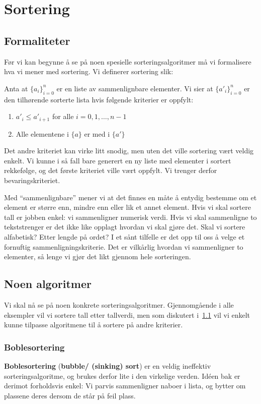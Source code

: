 \section{\color{red}Sortering}
\subsection{Formaliteter}
\label{sort_form}
Før vi kan begynne å se på noen spesielle sorteringsalgoritmer må vi formalisere hva vi mener med sortering. Vi definerer sortering slik:

\begin{definisjon}
Anta at $ {\{a_i\}}_{i=0}^n $ er en liste av sammenlignbare elementer. Vi sier at $ {\{a'_i\}}_{i=0}^n $ er den tilhørende sorterte lista hvis følgende kriterier er oppfylt:
\begin{enumerate}[i]
\item $ a'_i \leq a'_{i+1} $ for alle $ i = 0, 1, \ldots, n-1 $
\item Alle elementene i $ \{a\} $ er med i $ \{a'\} $
\end{enumerate}
\end{definisjon}

Det andre kriteriet kan virke litt snodig, men uten det ville sortering vært veldig enkelt. Vi kunne i så fall bare generert en ny liste med elementer i sortert rekkefølge, og det første kriteriet ville vært oppfylt. Vi trenger derfor bevaringskriteriet. 

Med ``sammenlignbare'' mener vi at det finnes en måte å entydig bestemme om et element er større enn, mindre enn eller lik et annet element. Hvis vi skal sortere tall er jobben enkel: vi sammenligner numerisk verdi. Hvis vi skal sammenligne to tekststrenger er det ikke like opplagt hvordan vi skal gjøre det. Skal vi sortere alfabetisk? Etter lengde på ordet? I et sånt tilfelle er det opp til oss å velge et fornuftig sammenligningskriterie. Det er vilkårlig hvordan vi sammenligner to elementer, så lenge vi gjør det likt gjennom hele sorteringen. 


\subsection{\color{red}Noen algoritmer}
Vi skal nå se på noen konkrete sorteringsalgoritmer. Gjennomgående i alle
eksempler vil vi sortere tall etter tallverdi, men som diskutert i~\ref{sort_form} vil vi enkelt kunne tilpasse algoritmene til å sortere på andre kriterier. 


\subsubsection{\color{red}Boblesortering}
\label{bubble}
\textbf{Boblesortering} (\textbf{bubble/ (sinking) sort})  er en veldig ineffektiv sorteringsalgoritme, og brukes derfor lite i den virkelige verden. 
Idéen bak er derimot forholdsvis enkel:
Vi parvis sammenligner naboer i lista, og bytter om plassene deres dersom de står på feil plass.

